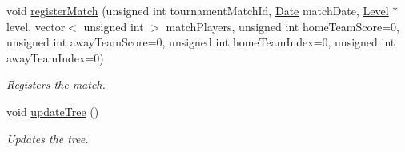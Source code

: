 \begin{DoxyCompactItemize}
void \hyperlink{class_tournament_a344a73233eab3d1c2aa1224ec2f3cd5b}{register\+Match} (unsigned int tournament\+Match\+Id, \hyperlink{class_date}{Date} match\+Date, \hyperlink{class_level}{Level} $\ast$level, vector$<$ unsigned int $>$ match\+Players, unsigned int home\+Team\+Score=0, unsigned int away\+Team\+Score=0, unsigned int home\+Team\+Index=0, unsigned int away\+Team\+Index=0)
\begin{DoxyCompactList}\small\item\em Registers the match. \end{DoxyCompactList}\item 
void \hyperlink{class_tournament_a98e75090ce3a6eddb2fdbe5f812d1894}{update\+Tree} ()
\begin{DoxyCompactList}\small\item\em Updates the tree. \end{DoxyCompactList}\end{DoxyCompactItemize}
